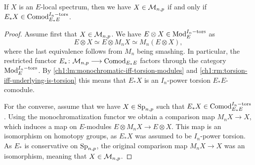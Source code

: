 \begin{lemma}
    \label{ch1:lm:monochromatic-iff-torsion-comodules}
    If $X$ is an $E$-local spectrum, then we have $X\in \mathcal{M}_{n,p}$ if and only if $E_*X\in \mathrm{Comod}_{E_*E}^{I_n-\mathrm{tors}}$. 
\end{lemma}
\begin{proof}
    Assume first that $X\in \mathcal{M}_{n,p}$. We have $E\otimes X\in \mathrm{Mod}_{E}^{I_n-\mathrm{tors}}$ as
    \[E\otimes X\simeq E\otimes M_n X\simeq M_n (E\otimes X),\]
    where the last equivalence follows from $M_n$ being smashing. In particular, the restricted functor $E_*\colon \mathcal{M}_{n,p}\longrightarrow \mathrm{Comod}_{E_*E}$ factors through the category $\mathrm{Mod}_{E}^{I_n-\mathrm{tors}}$. By \cref{ch1:lm:monochromatic-iff-torsion-modules} and \cref{ch1:rm:torsion-iff-underlying-is-torsion} this means that $E_*X$ is an $I_n$-power torsion $E_*E$-comodule. 

    For the converse, assume that we have $X\in \mathrm{Sp}_{n,p}$ such that $E_*X\in \mathrm{Comod}_{E_*E}^{I_n-\mathrm{tors}}$. Using the monochromatization functor we obtain a comparison map $M_n X\longrightarrow X$, which induces a map on $E$-modules $E\otimes M_n X\longrightarrow E\otimes X$. This map is an isomorphism on homotopy groups, as $E_*X$ was assumed to be $I_n$-power torsion. As $E_*$ is conservative on $\mathrm{Sp}_{n,p}$, the original comparison map $M_n X\longrightarrow X$ was an isomorphism, meaning that $X\in \mathcal{M}_{n,p}$. 
\end{proof}

